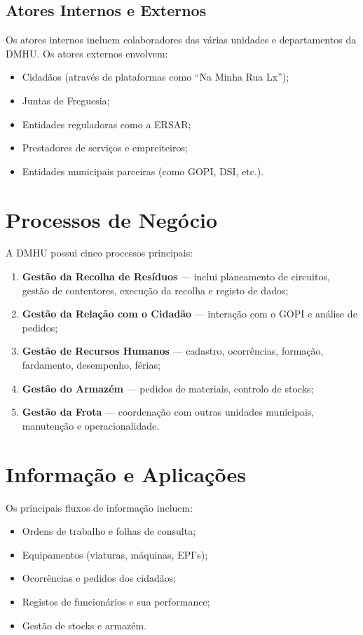 \documentclass[12pt,a4paper,final]{article}
\begin{document}
    \subsection{Atores Internos e Externos}
    Os atores internos incluem colaboradores das várias unidades e departamentos da DMHU. Os atores externos envolvem:
    \begin{itemize}
        \item Cidadãos (através de plataformas como “Na Minha Rua Lx”);
        \item Juntas de Freguesia;
        \item Entidades reguladoras como a ERSAR;
        \item Prestadores de serviços e empreiteiros;
        \item Entidades municipais parceiras (como GOPI, DSI, etc.).
    \end{itemize}

    \section{Processos de Negócio}
    A DMHU possui cinco processos principais:
    \begin{enumerate}
        \item \textbf{Gestão da Recolha de Resíduos} — inclui planeamento de circuitos, gestão de contentores, execução da recolha e registo de dados;
        \item \textbf{Gestão da Relação com o Cidadão} — interação com o GOPI e análise de pedidos;
        \item \textbf{Gestão de Recursos Humanos} — cadastro, ocorrências, formação, fardamento, desempenho, férias;
        \item \textbf{Gestão do Armazém} — pedidos de materiais, controlo de stocks;
        \item \textbf{Gestão da Frota} — coordenação com outras unidades municipais, manutenção e operacionalidade.
    \end{enumerate}

    \section{Informação e Aplicações}
    Os principais fluxos de informação incluem:
    \begin{itemize}
        \item Ordens de trabalho e folhas de consulta;
        \item Equipamentos (viaturas, máquinas, EPI’s);
        \item Ocorrências e pedidos dos cidadãos;
        \item Registos de funcionários e sua performance;
        \item Gestão de stocks e armazém.
    \end{itemize}
\end{document}
